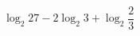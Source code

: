 \begin{ex}[type=calculate]
	\begin{condition}
		\( \log_2 27 - 2\log_2 3 + \log_2 \dfrac{2}{3}\)
	\end{condition}
\end{ex}